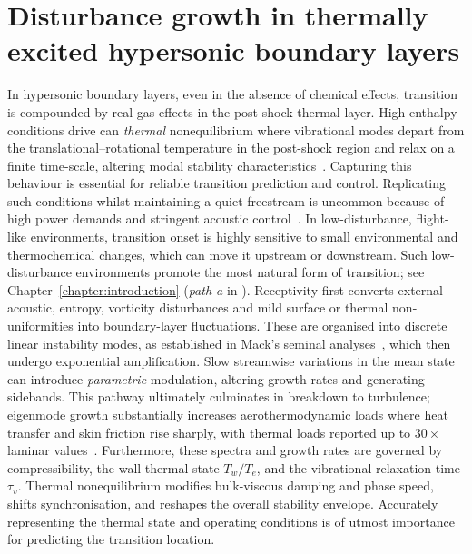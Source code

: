 \chapter{Disturbance growth in thermally excited hypersonic boundary layers}\label{chapter:disturbance_growth}

In hypersonic boundary layers, even in the absence of chemical effects,  transition is compounded by real-gas effects in the post-shock thermal layer. High-enthalpy conditions drive can \emph{thermal} nonequilibrium where vibrational modes depart from the translational--rotational temperature in the post-shock region and relax on a finite time-scale, altering modal stability characteristics~\citep{Candler2019}. Capturing this behaviour is essential for reliable transition prediction and control. Replicating such conditions whilst maintaining a quiet freestream is uncommon because of high power demands and stringent acoustic control~\citep{DiRenzo2021}. In low-disturbance, flight-like environments, transition onset is highly sensitive to small environmental and thermochemical changes, which can move it upstream or downstream. Such low-disturbance environments promote the most natural form of transition; see Chapter~\ref{chapter:introduction} (\textit{path a} in ). Receptivity first converts external acoustic, entropy, vorticity disturbances and mild surface or thermal non-uniformities into boundary-layer fluctuations. These are organised into discrete linear instability modes, as established in Mack's seminal analyses~\citep{Mack1984}, which then undergo exponential amplification. Slow streamwise variations in the mean state can introduce \emph{parametric} modulation, altering growth rates and generating sidebands. This pathway ultimately culminates in breakdown to turbulence; eigenmode growth substantially increases aerothermodynamic loads where heat transfer and skin friction rise sharply, with thermal loads reported up to $30\times$ laminar values~\citep{BitterShepherd2015}. Furthermore, these spectra and growth rates are governed by compressibility, the wall thermal state $T_w/T_e$, and the vibrational relaxation time $\tau_v$. Thermal nonequilibrium modifies bulk-viscous damping and phase speed, shifts synchronisation, and reshapes the overall stability envelope. Accurately representing the thermal state and operating conditions is of utmost importance for predicting the transition location.

